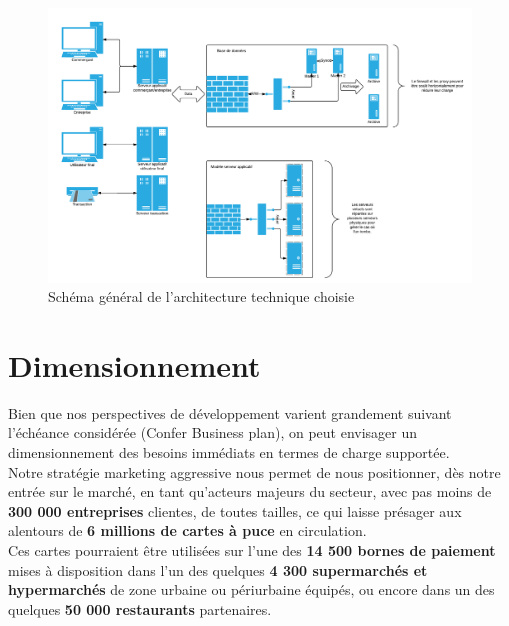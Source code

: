\begin{landscape}
  \begin{figure}[htpb]
      \centering
      \includegraphics[height=\textwidth]{network}
      \caption{Schéma général de l'architecture technique choisie}
      \label{fig:network}
  \end{figure}
\end{landscape}

\section{Dimensionnement}
\label{sec:Dimensionnement}

Bien que nos perspectives de développement varient grandement suivant
l'échéance considérée (Confer Business plan), on peut envisager un
dimensionnement des besoins immédiats en termes de charge supportée. \\

Notre stratégie marketing aggressive nous permet de nous positionner, dès notre
entrée sur le marché, en tant qu'acteurs majeurs du secteur, avec pas moins de
\textbf{300 000 entreprises} clientes, de toutes tailles, ce qui laisse
présager aux alentours de \textbf{6 millions de cartes à puce} en circulation.
\\

Ces cartes pourraient être utilisées sur l'une des \textbf{14 500 bornes de
paiement} mises à disposition dans l'un des quelques \textbf{4 300 supermarchés
et hypermarchés} de zone urbaine ou périurbaine équipés, ou encore dans un des
quelques \textbf{50 000 restaurants} partenaires. \\

